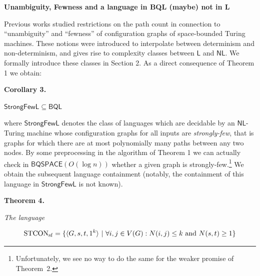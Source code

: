 \documentclass[10pt,a4paper]{article}
\begin{document}
\par\medskip\noindent\textbf{Unambiguity, Fewness and a language in BQL (maybe) not in L}\par




Previous works studied restrictions on the path count in connection to “unambiguity” and “fewness” of configuration graphs of space-bounded Turing machines.
These notions were introduced to interpolate between determinism and non-determinism, and gives rise to complexity classes between $\mathsf{L}$ and $\mathsf{NL}$. We formally introduce these classes in Section 2.
As a direct consequence of Theorem 1 we obtain:\par





\par\medskip\noindent\textbf{
\textbf{Corollary 3}\textbf{.}
}\par



$\mathsf{StrongFewL}\subseteq\mathsf{BQL}$\emph{}\par






where $\mathsf{StrongFewL}$ denotes the class of languages which are decidable by an $\mathsf{NL}$-Turing machine whose configuration graphs for all inputs are \emph{strongly-few}, that is graphs for which there are at most polynomially many paths between any two nodes.
By some preprocessing in the algorithm of Theorem 1 we can actually check in $\mathsf{BQSPACE}(O(\log n))$ whether a given graph is strongly-few.\footnote{Unfortunately, we see no way to do the same for the weaker promise of Theorem 2.}
We obtain the subsequent language containment (notably, the containment of this language in $\mathsf{StrongFewL}$ is not known).\par





\par\medskip\noindent\textbf{
\textbf{Theorem 4}\textbf{.}
}\par



\emph{The language}\par


\[\begin{gathered}
\displaystyle\mathrm{STCON}_{\mathrm{sf}}=\{\langle G,s,t,1^{k}\rangle\nobreak\ |\nobreak\ \forall i,j\in V(G):N(i,j)\leq k\text{ and }N(s,t)\geq 1\}
\end{gathered}\]
\end{document}
